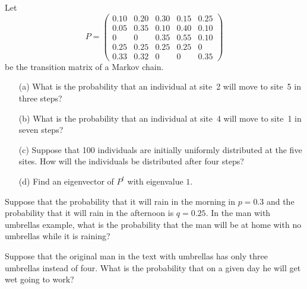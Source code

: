 \begin{exercise} \label{c4.10.7}
Let
\begin{equation*}
P = \left(\begin{array}{ccccc}
 0.10 & 0.20 & 0.30 & 0.15 & 0.25\\
 0.05 & 0.35 & 0.10 & 0.40 & 0.10\\
   0  &   0  & 0.35 & 0.55 & 0.10\\
 0.25 & 0.25 & 0.25 & 0.25 &   0\\
 0.33 & 0.32 &   0  &   0  & 0.35
\end{array}\right)
\end{equation*}
be the transition matrix of a Markov chain.
\begin{itemize}
\item[(a)]  What is the probability that an individual at site~2 will move to
site~5 in three steps?
\item[(b)]  What is the probability that an individual at site~4 will move to
site~1 in seven steps?
\item[(c)]  Suppose that 100 individuals are initially uniformly distributed
at the five sites.  How will the individuals be distributed after four steps?
\item[(d)]  Find an eigenvector of $P^t$ with eigenvalue $1$.
\end{itemize}
\end{exercise}

\begin{exercise} \label{c4.10.8}
Suppose that the probability that it will rain in the morning in $p=0.3$ and
the probability that it will rain in the afternoon is $q=0.25$.  In the man
with umbrellas example, what is the probability that the man will be at home
with no umbrellas while it is raining?
\end{exercise}

\begin{exercise} \label{c4.10.9}
Suppose that the original man in the text with umbrellas has only three
umbrellas instead of four.  What is the probability that on a given day he
will get wet going to work?
\end{exercise}



